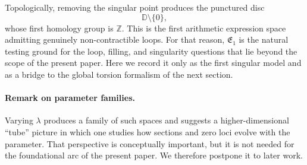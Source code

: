 Topologically, removing the singular point produces the punctured disc
\[
    \mathbb D\setminus\{0\},
\]
whose first homology group is $\mathbb Z$. This is the first arithmetic expression space admitting genuinely non-contractible loops. For that reason, $\mathfrak{E}_1$ is the natural testing ground for the loop, filling, and singularity questions that lie beyond the scope of the present paper. Here we record it only as the first singular model and as a bridge to the global torsion formalism of the next section.

\paragraph{Remark on parameter families.}
Varying $\lambda$ produces a family of such spaces and suggests a higher-dimensional ``tube'' picture in which one studies how sections and zero loci evolve with the parameter. That perspective is conceptually important, but it is not needed for the foundational arc of the present paper. We therefore postpone it to later work.
